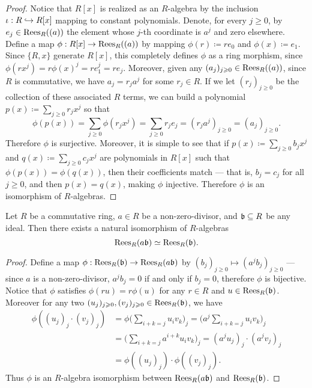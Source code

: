 \begin{proof}
    Notice that \(R[x]\) is realized as an \(R\)-algebra by the inclusion
    \(\iota: R \hookrightarrow R[x]\) mapping to constant polynomials. Denote, for every
    \(j \geq 0\), by \(e_j \in \operatorname{Rees}_R((a))\) the element whose \(j\)-th coordinate
    is \(a^j\) and zero elsewhere. Define a map \(\phi: R[x] \to \operatorname{Rees}_R((a))\) by
    mapping \(\phi(r) \coloneq r e_0\) and \(\phi(x) \coloneq e_1\).  Since
    \(\{R, x\}\) generate \(R[x]\), this completely defines \(\phi\) as a ring
    morphism, since \(\phi(r x^j) = r \phi(x)^j = r e_1^j = r e_j\). Moreover,
    given any \((a_j)_{j \geqslant 0} \in \operatorname{Rees}_R((a))\), since \(R\) is commutative, we
    have \(a_j = r_j a^j\) for some \(r_j \in R\). If we let \((r_j)_{j \geq 0}\) be
    the collection of these associated \(R\) terms, we can build a polynomial \(p(x)
    \coloneq \sum_{j \geq 0} r_j x^j\) so that
    \[
        \phi(p(x)) = \sum_{j \geq 0} \phi(r_j x^j) = \sum_{j \geq 0} r_j e_j
        = (r_j a^j)_{j \geq 0}
        = (a_j)_{j \geq 0}.
    \]
    Therefore \(\phi\) is surjective. Moreover, it is simple to see that if
    \(p(x) \coloneq \sum_{j \geq 0} b_j x^j\) and
    \(q(x) \coloneq \sum_{j \geq 0} c_j x^j\) are polynomials in \(R[x]\) such that
    \(\phi(p(x)) = \phi(q(x))\), then their coefficients match --- that is,
    \(b_j = c_j\) for all \(j \geq 0\), and then \(p(x) = q(x)\), making \(\phi\)
    injective. Therefore \(\phi\) is an isomorphism of \(R\)-algebras.
\end{proof}

\begin{proposition}
    \label{prop:rees-iso-ideal-a*ideal}
    Let \(R\) be a commutative ring, \(a \in R\) be a non-zero-divisor, and
    \(\mathfrak{b} \subseteq R\) be any ideal. Then there exists a natural isomorphism
    of \(R\)-algebras
    \[
        \operatorname{Rees}_R(a \mathfrak{b}) \simeq \operatorname{Rees}_R(\mathfrak{b}).
    \]
\end{proposition}

\begin{proof}
    Define a map \(\phi: \operatorname{Rees}_R(\mathfrak{b}) \to \operatorname{Rees}_R(a \mathfrak{b})\) by
    \((b_j)_{j \geq 0} \mapsto (a^j b_j)_{j \geq 0}\) --- since \(a\) is a
    non-zero-divisor, \(a^j b_j = 0\) if and only if \(b_j = 0\), therefore \(\phi\)
    is bijective. Notice that \(\phi\) satisfies \(\phi(r u) = r \phi(u)\) for any
    \(r \in R\) and \(u \in \operatorname{Rees}_R(\mathfrak{b})\). Moreover for any two \((u_j)_{j
            \geqslant 0}, (v_j)_{j \geqslant 0} \in \operatorname{Rees}_R(\mathfrak{b})\), we have
    \begin{align*}
        \phi((u_j)_j \cdot (v_j)_j)
         & = \phi \bigg( \sum_{i + k = j} u_i v_k \bigg)_j
        = \bigg( a^j \sum_{i + k = j} u_i v_k \bigg)_j          \\
         & = \bigg( \sum_{i + k = j} a^{i + k} u_i v_k \bigg)_j
        = (a^j u_j)_j \cdot (a^j v_j)_j                         \\
         & = \phi((u_j)_j) \cdot \phi((v_j)_j).
    \end{align*}
    Thus \(\phi\) is an \(R\)-algebra isomorphism between \(\operatorname{Rees}_R(a \mathfrak{b})\)
    and \(\operatorname{Rees}_R(\mathfrak{b})\).
\end{proof}


